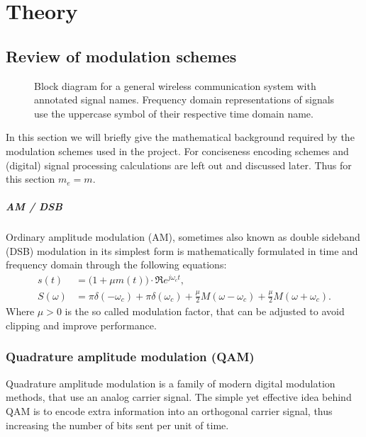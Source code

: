 
\chapter{Theory}

\section{Review of modulation schemes}

\begin{figure}
	\centering
	
	\caption{
		Block diagram for a general wireless communication system with annotated signal names.
		Frequency domain representations of signals use the uppercase symbol of their respective time domain name.
		\label{fig:notation}
	}
\end{figure}

In this section we will briefly give the mathematical background required by the modulation schemes used in the project. For conciseness encoding schemes and (digital) signal processing calculations are left out and discussed later. Thus for this section \(m_e = m\).

\paragraph{AM / DSB}

Ordinary amplitude modulation (AM), sometimes also known as double sideband (DSB) modulation in its simplest form is mathematically formulated in time and frequency domain through the following equations\cite{Hsu}:
\begin{subequations}
	\begin{align}
		s(t) &= \big( 1 + \mu m(t) \big) \cdot \Re{e^{j\omega_c t}}, \\
		S(\omega) &= \pi\delta(-\omega_c)
			+ \pi\delta(\omega_c)
			+ \frac{\mu}{2} M(\omega - \omega_c)
			+ \frac{\mu}{2} M(\omega + \omega_c).
	\end{align}
\end{subequations}
Where \(\mu > 0\) is the so called modulation factor, that can be adjusted to avoid clipping and improve performance.

\subsection{Quadrature amplitude modulation (QAM)}

Quadrature amplitude modulation is a family of modern digital modulation methods, that use an analog carrier signal. The simple yet effective idea behind QAM is to encode extra information into an orthogonal carrier signal, thus increasing the number of bits sent per unit of time.

